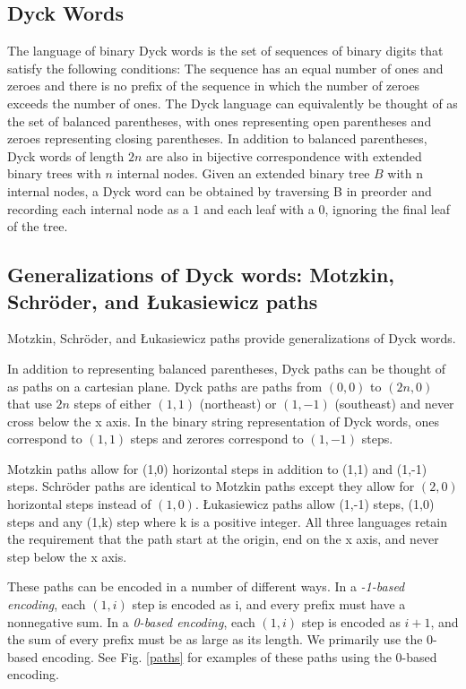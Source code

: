 

\subsection{Dyck Words}
The language of binary Dyck words is the set of sequences of binary digits that satisfy the following conditions: The sequence has an equal number of ones and zeroes and there is no prefix of the sequence in which the number of zeroes exceeds the number of ones.  The Dyck language can equivalently be thought of as the set of balanced parentheses, with ones representing open parentheses and zeroes representing closing parentheses.  
In addition to balanced parentheses, Dyck words of length $2n$ are also in bijective correspondence with extended binary trees with $n$ internal nodes. 
Given an extended binary tree $B$ with n internal nodes, a Dyck word can be obtained by traversing B in preorder and recording each internal node as a $1$ and each leaf with a $0$, ignoring the final leaf of the tree.

\subsection{Generalizations of Dyck words: Motzkin, Schröder, and Łukasiewicz paths}
Motzkin, Schröder, and Łukasiewicz paths provide generalizations of Dyck words.  

In addition to representing balanced parentheses, Dyck paths can be thought of as paths on a cartesian plane.  Dyck paths are paths from $(0,0)$ to $(2n,0)$ that use $2n$ steps of either $(1,1)$ (northeast) or $(1,-1)$ (southeast) and never cross below the x axis. In the binary string representation of Dyck words, ones correspond to $(1,1)$ steps and zerores correspond to $(1,-1)$ steps.

Motzkin paths allow for (1,0) horizontal steps in addition to (1,1) and (1,-1) steps. Schröder paths are identical to Motzkin paths except they allow for $(2,0)$ horizontal steps instead of $(1,0)$.  Łukasiewicz paths allow (1,-1) steps, (1,0) steps and any (1,k) step where k is a positive integer.  All three languages retain the requirement that the path start at the origin, end on the x axis, and never step below the x axis. 

These paths can be encoded in a number of different ways.  In a \emph{-1-based encoding}, each $(1,i)$ step is encoded as i, and every prefix must have a nonnegative sum.  In a \emph{0-based encoding}, each $(1,i)$ step is encoded as $i+1$, and the sum of every prefix must be as large as its length. We primarily use the 0-based encoding. See Fig. \ref{paths}  for examples of these paths using the 0-based encoding.

